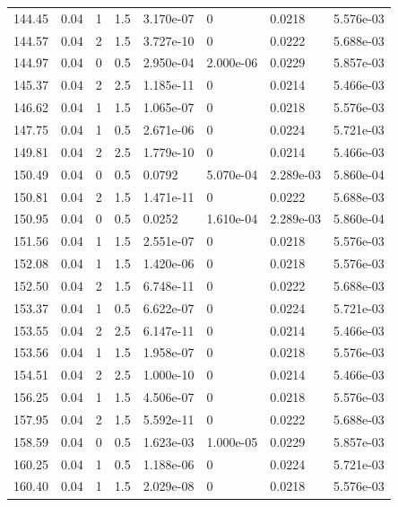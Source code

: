\documentclass[preview]{standalone}
\begin{document}
{{{{\begin{tabular}{L{1.2cm}C{1.2cm} C{0.3cm}C{0.5cm} C{1.4cm}C{1.4cm} C{1.4cm}C{1.4cm}}
  144.45  &  0.04  & 1     & 1.5 &  3.170e-07  & 0  & 0.0218 &  5.576e-03   \\ 
  144.57  &  0.04  & 2     & 1.5 &  3.727e-10  & 0  & 0.0222 &  5.688e-03   \\ 
  144.97  &  0.04  & 0     & 0.5 &  2.950e-04  & 2.000e-06  & 0.0229 &  5.857e-03   \\ 
  145.37  &  0.04  & 2     & 2.5 &  1.185e-11  & 0  & 0.0214 &  5.466e-03   \\ 
  146.62  &  0.04  & 1     & 1.5 &  1.065e-07  & 0  & 0.0218 &  5.576e-03   \\ 
  147.75  &  0.04  & 1     & 0.5 &  2.671e-06  & 0  & 0.0224 &  5.721e-03   \\ 
  149.81  &  0.04  & 2     & 2.5 &  1.779e-10  & 0  & 0.0214 &  5.466e-03   \\ 
  150.49  &  0.04  & 0     & 0.5 &  0.0792  & 5.070e-04  & 2.289e-03 &  5.860e-04   \\ 
  150.81  &  0.04  & 2     & 1.5 &  1.471e-11  & 0  & 0.0222 &  5.688e-03   \\ 
  150.95  &  0.04  & 0     & 0.5 &  0.0252  & 1.610e-04  & 2.289e-03 &  5.860e-04   \\ 
  151.56  &  0.04  & 1     & 1.5 &  2.551e-07  & 0  & 0.0218 &  5.576e-03   \\ 
  152.08  &  0.04  & 1     & 1.5 &  1.420e-06  & 0  & 0.0218 &  5.576e-03   \\ 
  152.50  &  0.04  & 2     & 1.5 &  6.748e-11  & 0  & 0.0222 &  5.688e-03   \\ 
  153.37  &  0.04  & 1     & 0.5 &  6.622e-07  & 0  & 0.0224 &  5.721e-03   \\ 
  153.55  &  0.04  & 2     & 2.5 &  6.147e-11  & 0  & 0.0214 &  5.466e-03   \\ 
  153.56  &  0.04  & 1     & 1.5 &  1.958e-07  & 0  & 0.0218 &  5.576e-03   \\ 
  154.51  &  0.04  & 2     & 2.5 &  1.000e-10  & 0  & 0.0214 &  5.466e-03   \\ 
  156.25  &  0.04  & 1     & 1.5 &  4.506e-07  & 0  & 0.0218 &  5.576e-03   \\ 
  157.95  &  0.04  & 2     & 1.5 &  5.592e-11  & 0  & 0.0222 &  5.688e-03   \\ 
  158.59  &  0.04  & 0     & 0.5 &  1.623e-03  & 1.000e-05  & 0.0229 &  5.857e-03   \\ 
  160.25  &  0.04  & 1     & 0.5 &  1.188e-06  & 0  & 0.0224 &  5.721e-03   \\ 
  160.40  &  0.04  & 1     & 1.5 &  2.029e-08  & 0  & 0.0218 &  5.576e-03   \\ 

\end{tabular}}}}}
\end{document}
